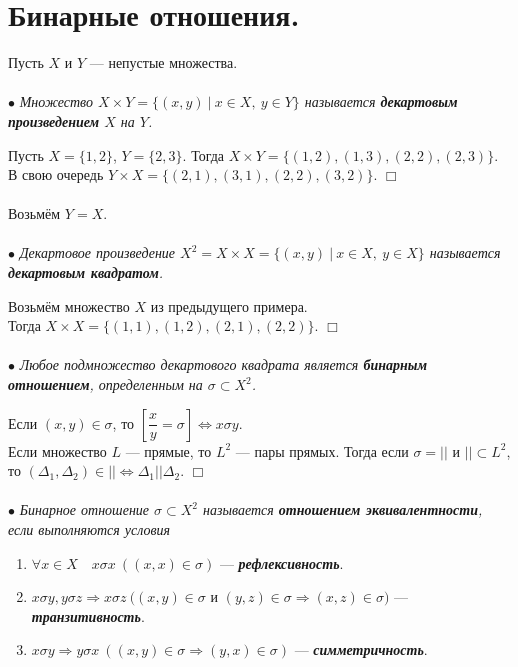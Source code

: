 \documentclass[a4paper, 12pt]{report}
\newenvironment{examp} %
{\par\noindent{\textbf{\textsc{Пример:}}}} %
{\hfill$\scriptstyle\Box$}
\begin{document}
	\section{Бинарные отношения.}
	Пусть $X$ и $Y$ --- непустые множества.\\\\
	$\bullet$ \textit{Множество $X \times Y = \{ (x,y)\ |\ x\in X,\ y \in Y\}$ называется \textbf{декартовым произведением} $X$ на $Y$.}\\
\begin{examp}
		Пусть $X = \{1,2\}$, $Y = \{2, 3\}$. Тогда $X\times Y = \{(1,2), (1,3), (2,2), (2,3)\}$. В свою очередь $Y\times X = \{ (2,1), (3,1), (2,2), (3,2)\}$.
\end{examp}\\\\
	Возьмём $Y = X$.\\\\
	$\bullet$ \textit{Декартовое произведение $X^2 = X\times X = \{ (x,y)\ |\ x\in X,\ y \in X\}$ называется \textbf{декартовым квадратом}.}\\
	\begin{examp}
	Возьмём множество $X$ из предыдущего примера.\\ Тогда $X \times X = \{ (1,1), (1,2), (2,1), (2,2)\}$.
	\end{examp}\\\\
	$\bullet$ \textit{Любое подмножество декартового квадрата является \textbf{бинарным отношением}, определенным на $\sigma \subset X^2$.}\\
	\begin{examp}
		Если $(x,y)\in \sigma$, то $[\dfrac{x}{y} = \sigma]\Longleftrightarrow x\sigma y$.\\
	Если множество $L$ --- прямые, то $L^2$ --- пары прямых. Тогда если $\sigma = ||$ и $|| \subset L^2$, то $(\Delta_1, \Delta_2)\in || \Longleftrightarrow \Delta_1 || \Delta_2$.
	\end{examp}\\\\
	$\bullet$ \textit{Бинарное отношение $\sigma \subset X^2$ называется \textbf{отношением эквивалентности}, если выполняются условия}\begin{enumerate}
		\item $\forall x\in X\quad x\sigma x\ ((x,x) \in \sigma)$ --- \textit{\textbf{рефлексивность}}.
		\item $x \sigma y, y\sigma z\Rightarrow x \sigma z\ ((x,y) \in \sigma$ и $(y,z) \in \sigma \Rightarrow (x,z) \in \sigma)$ --- \textit{\textbf{транзитивность}}.
		\item $x \sigma y\Rightarrow y\sigma x\ ((x,y)\in \sigma\Rightarrow (y,x) \in \sigma)$ --- \textbf{\textit{симметричность}}.
	\end{enumerate}
\end{document}
